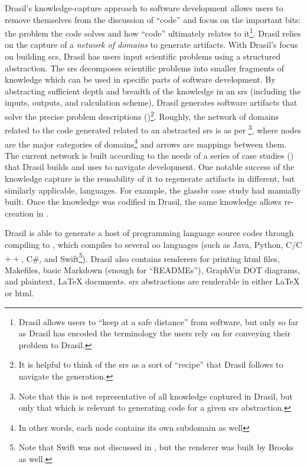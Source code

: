 \roughNetworkOfDomains{}

Drasil's knowledge-capture approach to software development allows users to
remove themselves from the discussion of ``code'' and focus on the important
bits: the problem the code solves and how ``code'' ultimately relates to
it\footnote{Drasil allows users to ``keep at a safe distance'' from software,
but only so far as Drasil has encoded the terminology the users rely on for
conveying their problem to Drasil.}. Drasil relies on the capture of a
\textit{network of domains} \cite{Czarnecki2005} to generate artifacts. With
Drasil's focus on building \acs{scs}, Drasil has users input scientific problems
using a structured  \cite{SmithAndLai2005} abstraction. The \acs{srs}
decomposes scientific problems into smaller fragments of knowledge which can be
used in specific parts of software development. By abstracting sufficient depth
and breadth of the knowledge in an \acs{srs} (including the inputs, outputs, and
calculation scheme), Drasil generates software artifacts that solve the precise
problem descriptions ()\footnote{It is helpful to
think of the \acs{srs} as a sort of ``recipe'' that Drasil follows to navigate
the generation.}. Roughly, the network of domains related to the code generated
related to an abstracted \acs{srs} is as per
\footnote{Note that this is not representative of all
knowledge captured in Drasil, but only that which is relevant to generating code
for a given \acs{srs} abstraction.}, where nodes are the major categories of
domains\footnote{In other words, each node contains its own subdomain as well}
and arrows are mappings between them. The current network is built according to
the needs of a series of case studies () that Drasil
builds and uses to navigate development. One notable success of the knowledge
capture is the reusability of it to regenerate artifacts in different, but
similarly applicable, languages. For example, the \acs{glassbr} case study had
manually built. Once the knowledge was codified in Drasil, the same knowledge
allows re-creation in .

\caseStudiesTable{}

Drasil is able to generate a host of  programming language source codes
through compiling to  \cite{Carette2019,MacLachlan2020}, which
compiles to several \acs{oo} languages (such as Java, Python, C/C$++$, C\#, and
Swift\footnote{Note that Swift was not discussed in \cite{MacLachlan2020}, but
      the renderer was built by Brooks as well.}). Drasil also contains renderers for
printing \acs{html} files, Makefiles, basic Markdown (enough for ``READMEs''),
GraphViz DOT \cite{Gansner1993} diagrams, and plaintext, \LaTeX{} documents.
\acs{srs} abstractions are renderable in either \LaTeX{} or \acs{html}.

